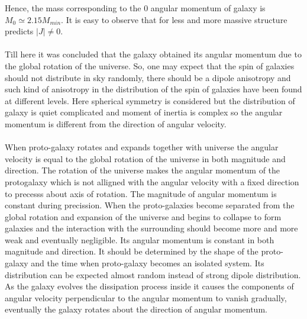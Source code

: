 \noindent Hence, the mass corresponding to the 0 angular momentum of galaxy is  $M_0\simeq 2.15 M_{min}$. It is easy to observe that for less and more massive structure predicts $\mid J\mid \neq 0$.\\\\
Till here it was concluded that the galaxy obtained its angular momentum due to the global rotation of the universe. So, one may expect that the spin of galaxies should not distribute in sky randomly, there should be a dipole anisotropy and such kind of anisotropy in the distribution of the spin of galaxies have been found at different levels. Here spherical symmetry is considered but the distribution of galaxy is quiet complicated and moment of inertia is complex so the angular momentum is different from the direction of angular velocity.\\\\
When proto-galaxy rotates and expands together with universe the angular velocity is equal to the global rotation of the universe in both magnitude and direction. The rotation of the universe makes the angular momentum of the protogalaxy which is not alligned with the angular velocity with a fixed direction to precesss about axis of rotation. The magnitude of angular momentum is constant during precission. When the proto-galaxies become separated from the global rotation and expansion of the universe and begins to collapse to form galaxies and the interaction with the surrounding should become more and more weak and eventually negligible. Its angular momentum is constant in both magnitude and direction. It should be determined by the shape of the proto-galaxy and the time when proto-galaxy becomes an isolated system. Its distribution can be expected  almost random instead of strong dipole distribution. As the galaxy evolves the dissipation process inside it causes the components of angular velocity perpendicular to the angular momentum to vanish gradually, eventually the galaxy rotates about the direction of angular momentum.
%